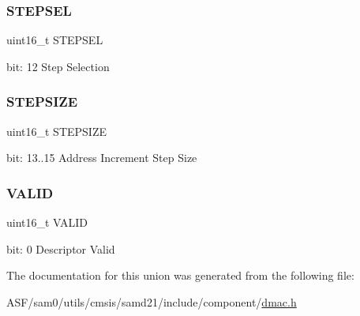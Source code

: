 \subsubsection{\texorpdfstring{STEPSEL}{STEPSEL}}
{\footnotesize\ttfamily uint16\+\_\+t S\+T\+E\+P\+S\+EL}

bit\+: 12 Step Selection \mbox{\label{union_d_m_a_c___b_t_c_t_r_l___type_a858501bd676af9d6546b02dde52f90a8}} 
\subsubsection{\texorpdfstring{STEPSIZE}{STEPSIZE}}
{\footnotesize\ttfamily uint16\+\_\+t S\+T\+E\+P\+S\+I\+ZE}

bit\+: 13..15 Address Increment Step Size \mbox{\label{union_d_m_a_c___b_t_c_t_r_l___type_a51f4f09f6db78bb23c72d61d0aa6637a}} 
\subsubsection{\texorpdfstring{VALID}{VALID}}
{\footnotesize\ttfamily uint16\+\_\+t V\+A\+L\+ID}

bit\+: 0 Descriptor Valid 

The documentation for this union was generated from the following file\+:\begin{DoxyCompactItemize}
\item 
A\+S\+F/sam0/utils/cmsis/samd21/include/component/\mbox{\hyperlink{component_2dmac_8h}{dmac.\+h}}\end{DoxyCompactItemize}
